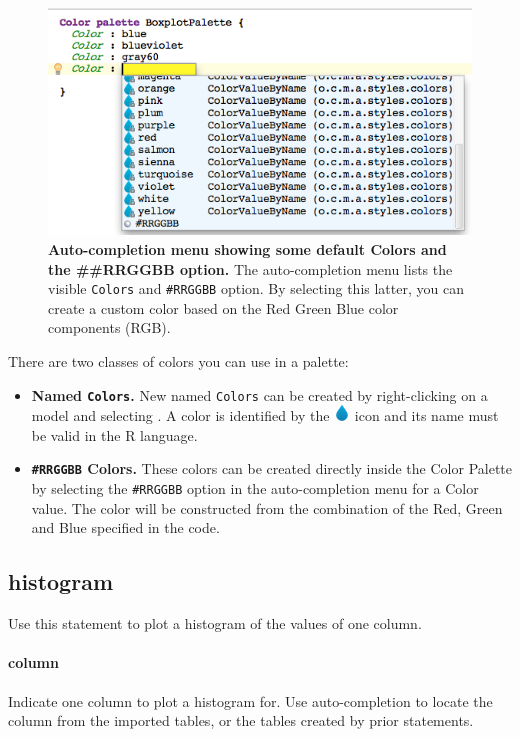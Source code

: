 \begin{figure}[h!tbp]
  \centering
  \includegraphics[width=\figWidthWide]{figures/ColorItem.png}
\caption[Color Item.]{\textbf{Auto-completion menu showing some default Colors and the \#\#RRGGBB option.} The auto-completion menu lists the visible \texttt{Colors} and \texttt{\#RRGGBB} option. By selecting this latter, you can create a custom color based on the Red Green Blue color components (RGB).}
\label{fig:ColorItem}
\end{figure}

There are two classes of colors you can use in a palette:
\begin{itemize}
\item \textbf{Named \texttt{Colors}.} New named \texttt{Colors} can be created by right-clicking on a model and selecting . A color is identified by the \includegraphics[height=2ex]{figures/color.png} icon and its name must be valid in the R language.
\item \textbf{\texttt{\#RRGGBB} Colors.} These colors can be created directly inside the Color Palette by selecting the \texttt{\#RRGGBB} option in the auto-completion menu for a Color value. The color will be constructed from the combination of the Red, Green and Blue specified in the code.
\end{itemize} 

\subsection{histogram}
Use this statement to plot a histogram of the values of one column.
\paragraph{column}
Indicate one column to plot a histogram for. Use auto-completion to locate the column from the imported tables, or the tables created by prior statements. 


